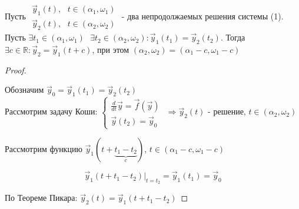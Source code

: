 \documentclass[12pt, a4paper]{report}
\begin{document}

\begin{theorem}
    Пусть \(\begin{aligned}
        \vec{ y } _1 (t ) , \text{ }  t \in  (\alpha_1 , \omega_1 ) \\ 
        \vec{ y }  _2 (t ) ,\text{ }  t \in  (\alpha_2 , \omega_2 )
    \end{aligned}\) - два непродолжаемых решения системы (1). Пусть \( \exists  t_1 \in  (\alpha_1 , \omega_1 ) \text{ }  \exists  t_2 \in (\alpha_2 , \omega_2 ) : \vec{ y}  _1 (t_1 ) = \vec{ y } _2 (t_2 ) \). Тогда \( \exists  c \in \mathbb{R} : \vec{ y}  _2 = \vec{ y}  _1 (t +c) \), при этом \( (\alpha_2, \omega_2) = (\alpha_1 - c , \omega_1 - c )\) 
\end{theorem}

\begin{proof} \(  \) 

    Обозначим \( \vec{ y } _0 = \vec{ y } _1 (t_1 ) = \vec{ y}  _2 (t_2) \)\\ 

    Рассмотрим задачу Коши: \( \begin{cases}
    \displaystyle \frac{d}{dt }  \vec{ y}  = \vec{ f }  (\vec{ y} )\\ 
    \vec{ y}  (t_2 ) = \vec{ y}  _0
    \end{cases} \) \( \Rightarrow \vec{ y}  _2 (t )  \) - решение, \(  t \in  (\alpha_2 , \omega_2 ) \) 

    Рассмотрим функцию \( \vec{y } _1 (t+\underbrace{ t_1 - t_2 }_{c}) \), \(  t \in  (\alpha_1 - c , \omega_1 - c) \) 

    \[ \vec{ y }  _1 (t + t_1 - t_2 ) |_{t = t_2 } = \vec{y } _1 (t_1 ) = \vec{ y}  _0  \] 

    По Теореме Пикара: \( \vec{ y } _2 (t ) = \vec{ y}  _1 (t + t_1 -t_2) \) 

\end{proof}


\ifdefined\mainfile
\else
    
\end{document}
